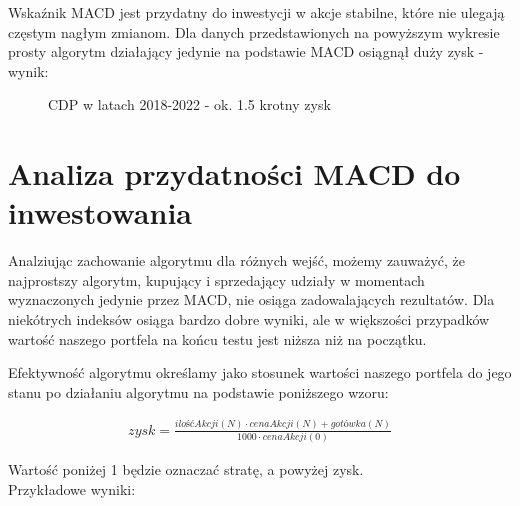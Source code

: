 \documentclass{article}
\begin{document}
    \newpage
    Wskaźnik MACD jest przydatny do inwestycji w akcje stabilne, które nie ulegają częstym nagłym zmianom.
    Dla danych przedstawionych na powyższym wykresie prosty algorytm działający jedynie na podstawie MACD
    osiągnął duży zysk - wynik:
   
    \begin{figure}[H]
        \noindent{}
        \caption{CDP w latach 2018-2022 - ok. 1.5 krotny zysk}
    \end{figure}
    

\newpage
\section{Analiza przydatności MACD do inwestowania}

    Analziując zachowanie algorytmu dla różnych wejść, możemy zauważyć, że najprostszy algorytm,
    kupujący i sprzedający udziały w momentach wyznaczonych jedynie przez MACD, nie osiąga zadowalających rezultatów. Dla niekótrych indeksów osiąga
    bardzo dobre wyniki, ale w większości przypadków wartość naszego portfela na końcu testu jest niższa niż na początku.

    
    Efektywność algorytmu określamy jako stosunek wartości naszego portfela
    do jego stanu po działaniu algorytmu na podstawie poniższego wzoru:

    \begin{align*} 
        zysk = \frac{\mathit{ilośćAkcji}(N) \cdot \mathit{cenaAkcji}(N) + \mathit{gotówka}(N)}{1000 \cdot \mathit{cenaAkcji}(0)}
    \end{align*}


    \noindent Wartość poniżej 1 będzie oznaczać stratę, a powyżej zysk.\\
    \noindent Przykładowe wyniki:
\end{document}
